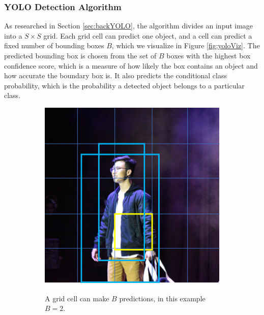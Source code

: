 \subsubsection{YOLO Detection Algorithm}
As researched in Section \ref{sec:backYOLO}, the algorithm divides an input image into a $S\times S$ grid. Each grid cell can predict one object, and a cell can predict a fixed number of bounding boxes $B$, which we visualize in Figure \ref{fig:yoloViz}. The predicted bounding box is chosen from the set of $B$ boxes with the highest box confidence score, which is a measure of how likely the box contains an object and how accurate the boundary box is. It also predicts the conditional class probability, which is the probability a detected object belongs to a particular class. 

\begin{figure}[ht]
    \begin{subfigure}[b]{.45\textwidth}
        \centering
        \includegraphics[width=1.0\linewidth]{img/chapter5_implementation/yoloAlgo1.png}
        \caption{A grid cell can make $B$ predictions, in this example $B=2$.}
    \end{subfigure}%
    \hspace{\fill} 
    \begin{subfigure}[b]{.45\textwidth}

\end{subfigure}
\end{figure}
